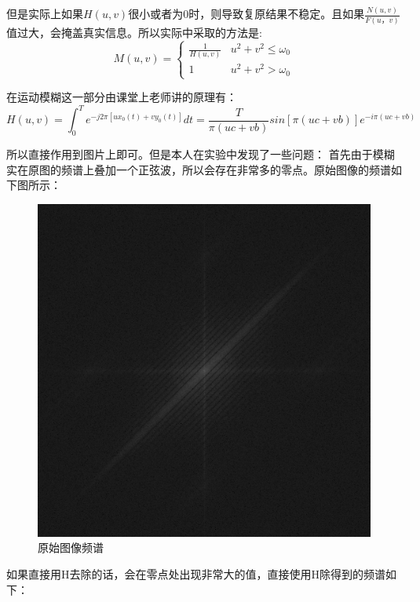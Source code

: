 \documentclass{article}
\begin{document}
			但是实际上如果$H(u,v)$很小或者为0时，则导致复原结果不稳定。且如果$\frac{N(u ,v)}{F(u，v)}$值过大，会掩盖真实信息。所以实际中采取的方法是:
			\begin{equation}
			M(u , v) = \left\{
				\begin{array}{lr}
					\frac{1}{H(u ,v)} & u^2 + v^2 \le \omega_0 \\
					1 & u^2+v^2 > \omega_0
				\end{array}
				\right.
			\end{equation}

		在运动模糊这一部分由课堂上老师讲的原理有：
		$$H(u ,v) = \int_{0}^{T}{e^{-j2\pi[ux_0(t) + vy_0(t)]}}dt = \frac{T}{\pi(uc+vb)}sin[\pi(uc+vb)]e^{-i\pi(uc+vb)}$$
		
		所以直接作用到图片上即可。但是本人在实验中发现了一些问题：
		首先由于模糊实在原图的频谱上叠加一个正弦波，所以会存在非常多的零点。原始图像的频谱如下图所示：
		
		\begin{figure}[H]
			\centering
			\includegraphics[scale = 0.5]{original_fft.png}
			\caption{原始图像频谱}
		\end{figure}
		
		如果直接用H去除的话，会在零点处出现非常大的值，直接使用H除得到的频谱如下：
		
\end{document}
